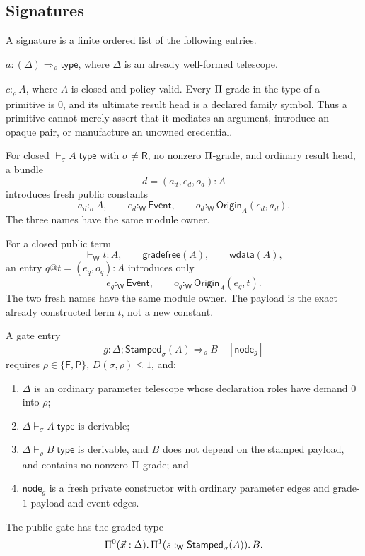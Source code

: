 \documentclass[11pt]{article}
\numberwithin{equation}{section}
\theoremstyle{definition}
\theoremstyle{plain}
\theoremstyle{remark}
\newcommand{\Type}{\mathsf{type}}
\newcommand{\Event}{\mathsf{Event}}
\newcommand{\Origin}{\mathsf{Origin}}
\newcommand{\Stamped}{\mathsf{Stamped}}
\newcommand{\Frm}{\mathsf F}
\newcommand{\Prs}{\mathsf P}
\newcommand{\Wit}{\mathsf W}
\newcommand{\Ren}{\mathsf R}
\newcommand{\jtype}{\mathrel{\mathsf{type}}}
\begin{document}
\subsection{Signatures}

A signature is a finite ordered list of the following entries.

\begin{description}[leftmargin=3.2cm,style=nextline]
\item[Family]
\(
  a:(\Delta)\Rightarrow_{\rho}\Type
\), where \(\Delta\) is an already well-formed telescope.
\item[Primitive]
\(
  c:_{\rho}A
\), where \(A\) is closed and policy valid.  Every \(\Pi\)-grade in the
type of a primitive is \(0\), and its ultimate result head is a declared
family symbol.  Thus a primitive cannot merely assert that it mediates an
argument, introduce an opaque pair, or manufacture an unowned credential.
\item[Certificate bundle]
For closed \(\vdash_{\sigma}A\;\jtype\) with \(\sigma\ne\Ren\), no nonzero
\(\Pi\)-grade, and ordinary result head, a bundle
\[
 d=(a_d,e_d,o_d):A
\]
introduces fresh public constants
\[
 a_d:_{\sigma}A,
 \qquad e_d:_{\Wit}\Event,
 \qquad o_d:_{\Wit}\Origin_A(e_d,a_d).
\]
The three names have the same module owner.
\item[Exact attestation]
For a closed public term
\[
 \vdash_{\Wit}t:A,
 \qquad
 \mathsf{gradefree}(A),
 \qquad
 \mathsf{wdata}(A),
\]
an entry \(q@t=(e_q,o_q):A\) introduces only
\[
 e_q:_{\Wit}\Event,
 \qquad
 o_q:_{\Wit}\Origin_A(e_q,t).
\]
The two fresh names have the same module owner.  The payload is the exact
already constructed term \(t\), not a new constant.
\item[Gate]
A gate entry
\[
 g:\Delta;\Stamped_\sigma(A)\Longrightarrow_{\rho} B
 \quad[\mathsf{node}_g]
\]
requires \(\rho\in\{\Frm,\Prs\}\), \(D(\sigma,\rho)\le1\), and:
\begin{enumerate}[label=(G\arabic*),leftmargin=3em]
\item \(\Delta\) is an ordinary parameter telescope whose declaration roles
have demand \(0\) into \(\rho\);
\item \(\Delta\vdash_{\sigma}A\;\jtype\) is derivable;
\item \(\Delta\vdash_{\rho}B\;\jtype\) is derivable, and \(B\) does not depend on
the stamped payload, and contains no nonzero \(\Pi\)-grade; and
\item \(\mathsf{node}_g\) is a fresh private constructor with ordinary
parameter edges and grade-\(1\) payload and event edges.
\end{enumerate}
The public gate has the graded type
\[
  \AFDepFun^0(\vec x:\Delta).\,
  \AFDepFun^1(s:_{\Wit}\Stamped_\sigma(A)).\,B.
\]
\end{description}
\end{document}
